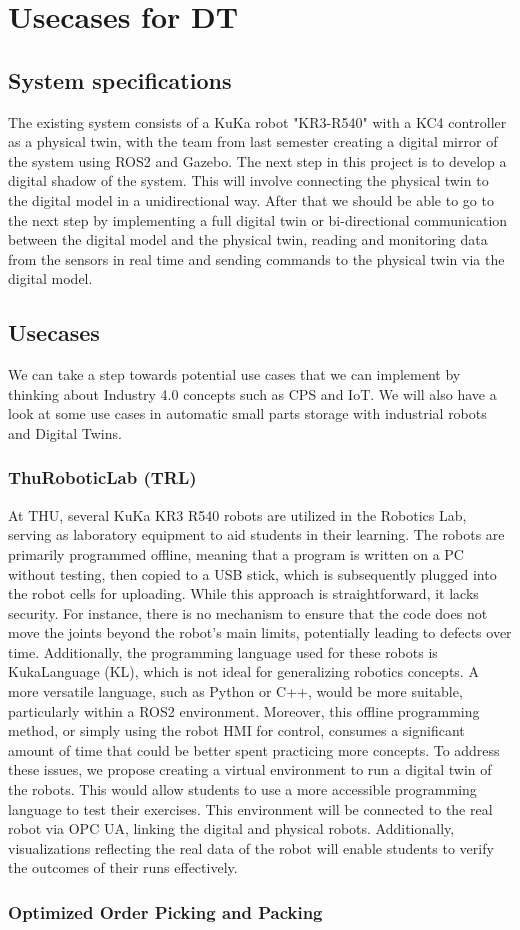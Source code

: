 \section{Usecases for DT}

\subsection{System specifications}

The existing system consists of a KuKa robot "KR3-R540" with a KC4 controller as a physical twin, with the team from last semester creating a digital mirror of the system using ROS2 and Gazebo.
The next step in this project is to develop a digital shadow of the system. This will involve connecting the physical twin to the digital model in a unidirectional way.
After that we should be able to go to the next step by implementing a full digital twin or bi-directional communication between the digital model and the physical twin, 
reading and monitoring data from the sensors in real time and sending commands to the physical twin via the digital model. 

\subsection{Usecases}

We can take a step towards potential use cases that we can implement by thinking about Industry 4.0 concepts such as CPS and IoT.
We will also have a look at some use cases in automatic small parts storage with industrial robots and Digital Twins.

\subsubsection{ThuRoboticLab (TRL)}
At THU, several KuKa KR3 R540 robots are utilized in the Robotics Lab, 
serving as laboratory equipment to aid students in their learning. 
The robots are primarily programmed offline, 
meaning that a program is written on a PC without testing, 
then copied to a USB stick, 
which is subsequently plugged into the robot cells for uploading.
While this approach is straightforward, 
it lacks security. For instance, 
there is no mechanism to ensure that the code does not move the joints beyond 
the robot's main limits, potentially leading to defects over time. Additionally, 
the programming language used for these robots is KukaLanguage (KL), 
which is not ideal for generalizing robotics concepts. 
A more versatile language, such as Python or C++, would be more suitable, 
particularly within a ROS2 environment.
Moreover, this offline programming method, 
or simply using the robot HMI for control, consumes a significant amount of time 
that could be better spent practicing more concepts.
To address these issues, 
we propose creating a virtual environment to run a digital twin of the robots. 
This would allow students to use a more accessible programming language to test 
their exercises. This environment will be connected to the real robot via OPC UA, 
linking the digital and physical robots. Additionally, 
visualizations reflecting the real data of the robot will enable students to 
verify the outcomes of their runs effectively.

\subsubsection{Optimized Order Picking and Packing}